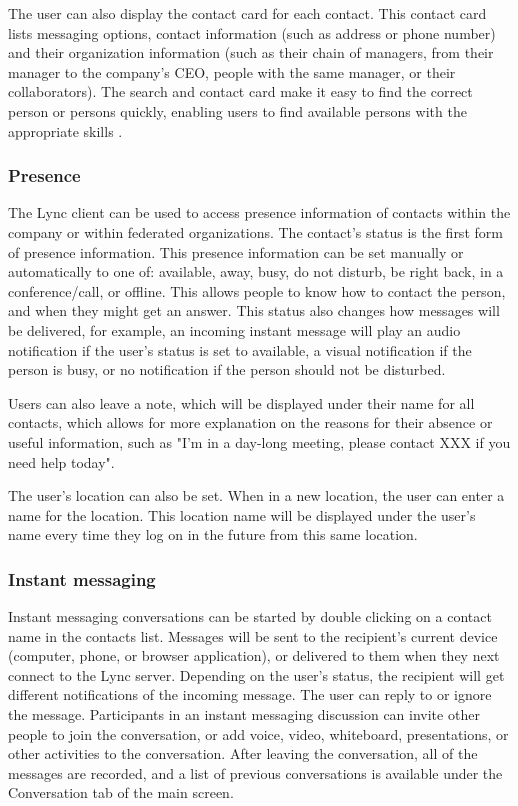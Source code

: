 The user can also display the contact card for each contact. This contact card lists messaging options, contact information (such as address or phone number) and their organization information (such as their chain of managers, from their manager to the company's CEO, people with the same manager, or their collaborators). The search and contact card make it easy to find the correct person or persons quickly, enabling users to find available persons with the appropriate skills
\cite[Ch. 1.1]{winters_mastering_2012}.


\subsubsection{Presence}
The Lync client can be used to access presence information of contacts within the company or within federated organizations. The contact's status is the first form of presence information. This presence information can be set manually or automatically to one of: available, away, busy, do not disturb, be right back, in a conference/call, or offline. This allows people to know how to contact the person, and when they might get an answer. This status also changes how messages will be delivered, for example, an incoming instant message will play an audio notification if the user's status is set to available, a visual notification if the person is busy, or no notification if the person should not be disturbed.

Users can also leave a note, which will be displayed under their name for all contacts, which allows for more explanation on the reasons for their absence or useful information, such as "I'm in a day-long meeting, please contact XXX if you need help today".

The user's location can also be set. When in a new location, the user can enter a name for the location. This location name will be displayed under the user's name every time they log on in the future from this same location\cite[Ch. 1.1]{winters_mastering_2012}.


\subsubsection{Instant messaging}
Instant messaging conversations can be started by double clicking on a contact name in the contacts list. Messages will be sent to the recipient's current device (computer, phone, or browser application), or delivered to them when they next connect to the Lync server. Depending on the user's  status, the recipient will get different notifications of the incoming message. The user can reply to or ignore the message. Participants in an instant messaging discussion can invite other people to join the conversation, or add voice, video, whiteboard, presentations, or other activities to the conversation. After leaving the conversation, all of the messages are recorded, and a list of previous conversations is available under the Conversation tab of the main screen.

